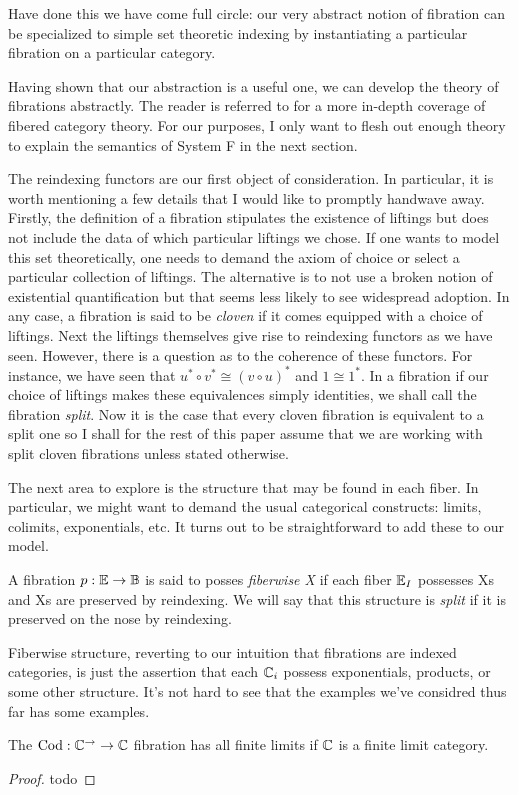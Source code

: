 Have done this we have come full circle: our very abstract notion of
fibration can be specialized to simple set theoretic indexing by
instantiating a particular fibration on a particular category.

Having shown that our abstraction is a useful one, we can develop the
theory of fibrations abstractly. The reader is referred to
\citet{Jacobs:01} for a more in-depth coverage of fibered category
theory. For our purposes, I only want to flesh out enough theory to
explain the semantics of System F in the next section.

The reindexing functors are our first object of consideration. In
particular, it is worth mentioning a few details that I would like to
promptly handwave away. Firstly, the definition of a fibration
stipulates the existence of liftings but does not include the data of
which particular liftings we chose. If one wants to model this set
theoretically, one needs to demand the axiom of choice or select a
particular collection of liftings. The alternative is to not use a
broken notion of existential quantification but that seems less likely
to see widespread adoption. In any case, a fibration is said to be
\emph{cloven} if it comes equipped with a choice of liftings. Next the
liftings themselves give rise to reindexing functors as we have
seen. However, there is a question as to the coherence of these
functors. For instance, we have seen that
$u^* \circ v^* \cong (v \circ u)^*$ and $1 \cong 1^*$. In a fibration
if our choice of liftings makes these equivalences simply identities,
we shall call the fibration \emph{split}. Now it is the case that
every cloven fibration is equivalent to a split one so I shall for the
rest of this paper assume that we are working with split cloven
fibrations unless stated otherwise.

The next area to explore is the structure that may be found in each
fiber. In particular, we might want to demand the usual categorical
constructs: limits, colimits, exponentials, etc. It turns out to be
straightforward to add these to our model.
\begin{defn}\label{defn:fibrations:fiberwiseX}
  A fibration $p : \mathbb{E} \to \mathbb{B}$ is said to posses \emph{fiberwise
    X} if each fiber $\mathbb{E}_I$ possesses Xs and Xs are preserved by
  reindexing. We will say that this structure is \emph{split} if it is
  preserved on the nose by reindexing.
\end{defn}
Fiberwise structure, reverting to our intuition that fibrations are
indexed categories, is just the assertion that each $\mathbb{C}_i$ possess
exponentials, products, or some other structure. It's not hard to see
that the examples we've considred thus far has some examples.
\begin{example}\label{defn:fibrations:codfiberwiseproducts}
  The $\operatorname{Cod} : \mathbb{C}^{\to} \to \mathbb{C}$ fibration has all finite limits
  if $\mathbb{C}$ is a finite limit category.
\end{example}
\begin{proof}
  todo
\end{proof}

